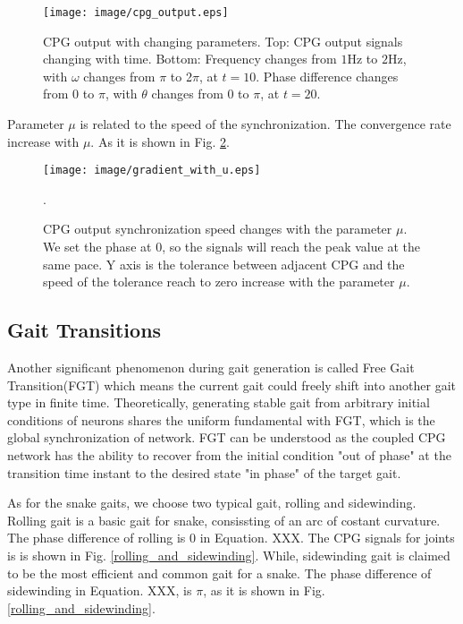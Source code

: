 \documentclass[letterpaper, 10 pt, conference]{ieeeconf}
\begin{document}
\begin{figure}[h]
    \centering
    \texttt{[image: image/cpg\_output.eps]}
    \caption{CPG output with changing parameters. Top: CPG output signals changing with time. Bottom: Frequency changes from $1$Hz to $2$Hz, with $\omega$ changes from $\pi$ to 2$\pi$, at $t=10$. Phase difference changes from $0$ to $\pi$, with $\theta$ changes from $0$ to $\pi$, at $t=20$.}
    \label{cpg_output}
\end{figure}

Parameter $\mu$ is related to the speed of the synchronization. The convergence rate increase with $\mu$. As it is shown in Fig. \ref{convergence_rate}.

\begin{figure}[!h]
    \centering
    \texttt{[image: image/gradient\_with\_u.eps]}
    \caption{CPG output synchronization speed changes with the parameter $\mu$. We set the phase at $0$, so the signals will reach the peak value at the same pace. Y axis is the tolerance between adjacent CPG and the speed of the tolerance reach to zero increase with the parameter $\mu$. }.
    \label{convergence_rate}
\end{figure}

\subsection{Gait Transitions}
Another significant phenomenon during gait generation is called Free Gait Transition(FGT) which means the current gait could freely shift into another gait type in finite time.
Theoretically, generating stable gait from arbitrary initial conditions of neurons shares the uniform fundamental with FGT, which is the global synchronization of network.
FGT can be understood as the coupled CPG network has the ability to recover from the initial condition "out of phase" at the transition time instant to the desired state "in phase" of the target gait.


As for the snake gaits, we choose two typical gait, rolling and sidewinding. Rolling gait is a basic gait for snake, consissting of an arc of costant curvature. The phase difference of rolling is $0$ in Equation. XXX. The CPG signals for joints is is shown in Fig. \ref{rolling_and_sidewinding}.
While, sidewinding\cite{sidewinding} gait is claimed to be the most efficient and common gait for a snake. The phase difference of sidewinding in Equation. XXX, is $\pi$, as it is shown in Fig. \ref{rolling_and_sidewinding}.
\end{document}
